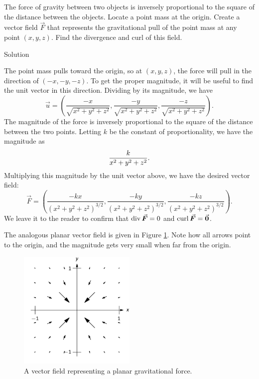 \begin{example}\label{ex_vectorfield3}
The force of gravity between two objects is inversely proportional to the square of the distance between the objects. Locate a point mass at the origin. Create a vector field $\vec F$ that represents the gravitational pull of the point mass at any point $(x,y,z)$. Find the divergence and curl of this field. 


Solution 

The point mass pulls toward the origin, so at $(x,y,z)$, the force will pull in the direction of $\left( -x, -y, -z\right)$. To get the proper magnitude, it will be useful to find the unit vector in this direction. Dividing by its magnitude, we have $$\vec u = \left( \frac{-x}{\sqrt{x^2+y^2+z^2}}, \frac{-y}{\sqrt{x^2+y^2+z^2}},\frac{-z}{\sqrt{x^2+y^2+z^2}}\right).$$
The magnitude of the force is inversely proportional to the square of the distance between the two points. Letting $k$ be the constant of proportionality, we have the magnitude as $$\displaystyle\frac{k}{x^2+y^2+z^2}.$$ Multiplying this magnitude by the unit vector above, we have the desired vector field:
$$\vec F = \left( \frac{-kx}{(x^2+y^2+z^2)^{3/2}}, \frac{-ky}{(x^2+y^2+z^2)^{3/2}},\frac{-kz}{(x^2+y^2+z^2)^{3/2}}\right).$$
We leave it to the reader to confirm that $\divv \vec F = 0$ and $\curl \vec F = \vec 0$.

The analogous planar vector field is given in Figure \ref{fig_double_27}. Note how all arrows point to the origin, and the magnitude gets very small when far from the origin.

\begin{figure}[H]
	\begin{center}
			\includegraphics[width=0.5\textwidth]{fig_double_27}
	\caption{A vector field representing a planar gravitational force.}
	\label{fig_double_27}
	\end{center}
\end{figure}

\end{example}





